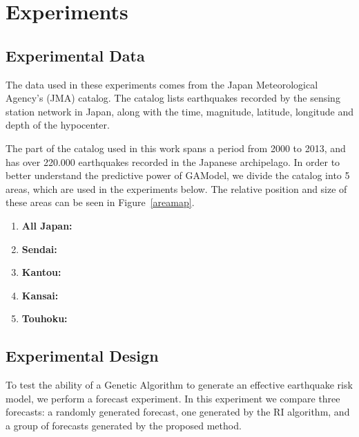 \documentclass{sig-alternate}
\begin{document}

\section{Experiments}

\subsection{Experimental Data}\label{data}

The data used in these experiments comes from the Japan Meteorological
Agency's (JMA) catalog. The catalog lists earthquakes recorded by the
sensing station network in Japan, along with the time, magnitude,
latitude, longitude and depth of the hypocenter.

The part of the catalog used in this work spans a period from 2000 to
2013, and has over 220.000 earthquakes recorded in the Japanese
archipelago. In order to better understand the predictive power of
GAModel, we divide the catalog into 5 areas, which are used in the
experiments below. The relative position and size of these areas can
be seen in Figure~\ref{areamap}.

\begin{enumerate}
  \item {\bf All Japan:}
  \item {\bf Sendai:}
  \item {\bf Kantou:}
  \item {\bf Kansai:}
  \item {\bf Touhoku:}
\end{enumerate}


\subsection{Experimental Design} %

To test the ability of a Genetic Algorithm to generate an effective
earthquake risk model, we perform a forecast experiment. In this
experiment we compare three forecasts: a randomly generated forecast,
one generated by the RI algorithm, and a group of forecasts generated
by the proposed method.
\end{document}
